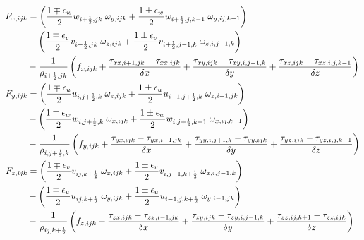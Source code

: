 \begin{align}
F_{x,ijk} &=  \left(
 \frac{1\mp\epsilon_w}{2} w_{i+\frac{1}{2},jk} \; \omega_{y,ijk} +
 \frac{1\pm\epsilon_w}{2} w_{i+\frac{1}{2},j,k-1} \; \omega_{y,ij,k-1} \right) \nonumber \\
          &  - \left(
 \frac{1\mp\epsilon_v}{2} v_{i+\frac{1}{2},jk} \; \omega_{z,ijk} +
 \frac{1\pm\epsilon_v}{2} v_{i+\frac{1}{2},j-1,k} \; \omega_{z,i,j-1,k} \right) \nonumber\\
           &  - \frac{1}{\rho_{i+\frac{1}{2},jk}} \left( f_{x,ijk}
  + \frac{\tau_{xx,i+1,jk}-\tau_{xx,ijk}}{\delta x}
  + \frac{\tau_{xy,ijk}-\tau_{xy,i,j-1,k}}{\delta y}
  + \frac{\tau_{xz,ijk}-\tau_{xz,i,j,k-1}}{\delta z}  \right)  \\
F_{y,ijk} &= \left(
 \frac{1\mp\epsilon_u}{2} u_{i,j+\frac{1}{2},k} \; \omega_{z,ijk} +
 \frac{1\pm\epsilon_u}{2} u_{i-1,j+\frac{1}{2},k} \; \omega_{z,i-1,jk} \right) \nonumber \\
           &  - \left(
 \frac{1\mp\epsilon_w}{2} w_{i,j+\frac{1}{2},k} \; \omega_{x,ijk}+
 \frac{1\pm\epsilon_w}{2} w_{i,j+\frac{1}{2},k-1} \; \omega_{x,ij,k-1} \right) \nonumber \\
           &  - \frac{1}{\rho_{i,j+\frac{1}{2},k}} \left( f_{y,ijk}
  + \frac{\tau_{yx,ijk}-\tau_{yx,i-1,jk}}{\delta x}
  + \frac{\tau_{yy,i,j+1,k}-\tau_{yy,ijk}}{\delta y}
  + \frac{\tau_{yz,ijk}-\tau_{yz,i,j,k-1}}{\delta z} \right) \\
F_{z,ijk} &=  \left(
 \frac{1\mp\epsilon_v}{2} v_{ij,k+\frac{1}{2}} \; \omega_{x,ijk} +
 \frac{1\pm\epsilon_v}{2} v_{i,j-1,k+\frac{1}{2}} \; \omega_{x,i,j-1,k} \right)\nonumber \\
           &  -\left(
 \frac{1\mp\epsilon_u}{2} u_{ij,k+\frac{1}{2}} \; \omega_{y,ijk} +
 \frac{1\pm\epsilon_u}{2} u_{i-1,j,k+\frac{1}{2}} \; \omega_{y,i-1,jk} \right) \nonumber \\
           &  - \frac{1}{\rho_{ij,k+\frac{1}{2}}} \left( f_{z,ijk}
  + \frac{\tau_{zx,ijk}-\tau_{zx,i-1,jk}}{\delta x}
  + \frac{\tau_{zy,ijk}-\tau_{zy,i,j-1,k}}{\delta y}
  + \frac{\tau_{zz,ij,k+1}-\tau_{zz,ijk}}{\delta z} \right)
\end{align}

